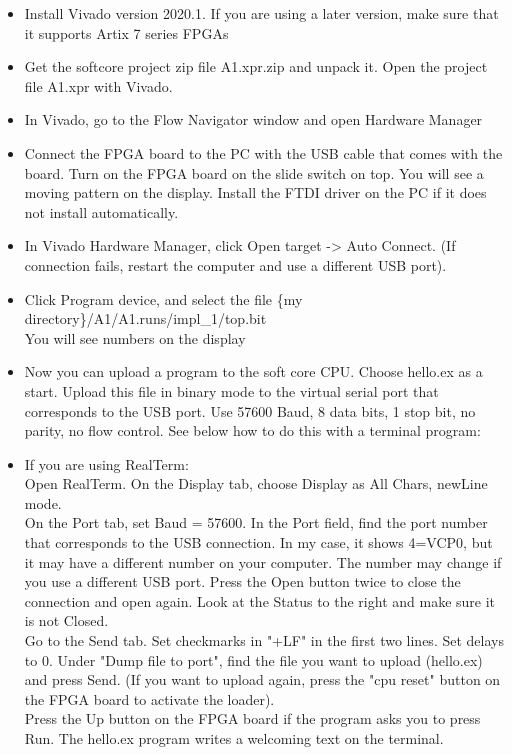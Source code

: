 \documentclass[11pt,a4paper,oneside,openright]{report}
\begin{document}
\begin{itemize}
\item Install Vivado version 2020.1. If you are using a later version, make sure that it supports Artix 7 series FPGAs
\item Get the softcore project zip file A1.xpr.zip and unpack it. Open the project file A1.xpr with Vivado.
\item In Vivado, go to the Flow Navigator window and open Hardware Manager
\item Connect the FPGA board to the PC with the USB cable that comes with the board. Turn on the FPGA board on the slide switch on top. You will see a moving pattern on the display. Install the FTDI driver on the PC if it does not install automatically.
\item In Vivado Hardware Manager, click Open target -> Auto Connect. (If connection fails, restart the computer and use a different USB port).
\item Click Program device, and select the file \{my directory\}/A1/A1.runs/impl\_1/top.bit \\
You will see numbers on the display
\item Now you can upload a program to the soft core CPU. Choose hello.ex as a start. Upload this file in binary mode to the virtual serial port that corresponds to the USB port. Use 57600 Baud, 8 data bits, 1 stop bit, no parity, no flow control. See below how to do this with a terminal program:
\item If you are using RealTerm: \\ 
Open RealTerm. On the Display tab, choose Display as All Chars, newLine mode. \\ 
On the Port tab, set Baud = 57600. In the Port field, find the port number that corresponds to the USB connection. In my case, it shows 4=VCP0, but it may have a different number on your computer. The number may change if you use a different USB port. Press the Open button twice to close the connection and open again. Look at the Status to the right and make sure it is not Closed.\\
Go to the Send tab. Set checkmarks in "+LF" in the first two lines. Set delays to 0. Under "Dump file to port", find the file you want to upload (hello.ex) and press Send. (If you want to upload again, press the "cpu reset" button on the FPGA board to activate the loader).\\
Press the Up button on the FPGA board if the program asks you to press Run. The hello.ex program writes a welcoming text on the terminal.

\end{itemize}
\end{document}
